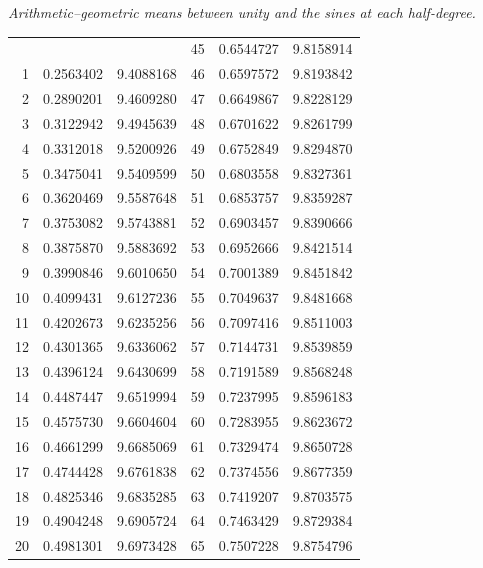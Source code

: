 \begingroup
\renewcommand{\arraystretch}{1.45}
\clearpage
{}
\begin{center}
\textit{Arithmetic–geometric means between unity and the sines at each half-degree.}\par
\medskip
\begingroup\fontsize{9}{10.2}\selectfont\setlength{\tabcolsep}{4pt}\renewcommand{\arraystretch}{1.0}
\begin{tabular}{||r|r|r||r|r|r||}\hline\hline
 &  &  & 45 & 0.6544727 & 9.8158914 \\
1 & 0.2563402 & 9.4088168 & 46 & 0.6597572 & 9.8193842 \\
2 & 0.2890201 & 9.4609280 & 47 & 0.6649867 & 9.8228129 \\
3 & 0.3122942 & 9.4945639 & 48 & 0.6701622 & 9.8261799 \\
4 & 0.3312018 & 9.5200926 & 49 & 0.6752849 & 9.8294870 \\
5 & 0.3475041 & 9.5409599 & 50 & 0.6803558 & 9.8327361 \\[3pt]
6 & 0.3620469 & 9.5587648 & 51 & 0.6853757 & 9.8359287 \\
7 & 0.3753082 & 9.5743881 & 52 & 0.6903457 & 9.8390666 \\
8 & 0.3875870 & 9.5883692 & 53 & 0.6952666 & 9.8421514 \\
9 & 0.3990846 & 9.6010650 & 54 & 0.7001389 & 9.8451842 \\
10 & 0.4099431 & 9.6127236 & 55 & 0.7049637 & 9.8481668 \\[3pt]
11 & 0.4202673 & 9.6235256 & 56 & 0.7097416 & 9.8511003 \\
12 & 0.4301365 & 9.6336062 & 57 & 0.7144731 & 9.8539859 \\
13 & 0.4396124 & 9.6430699 & 58 & 0.7191589 & 9.8568248 \\
14 & 0.4487447 & 9.6519994 & 59 & 0.7237995 & 9.8596183 \\
15 & 0.4575730 & 9.6604604 & 60 & 0.7283955 & 9.8623672 \\[3pt]
16 & 0.4661299 & 9.6685069 & 61 & 0.7329474 & 9.8650728 \\
17 & 0.4744428 & 9.6761838 & 62 & 0.7374556 & 9.8677359 \\
18 & 0.4825346 & 9.6835285 & 63 & 0.7419207 & 9.8703575 \\
19 & 0.4904248 & 9.6905724 & 64 & 0.7463429 & 9.8729384 \\
20 & 0.4981301 & 9.6973428 & 65 & 0.7507228 & 9.8754796 \\[3pt]

\end{tabular}
\end{center}
